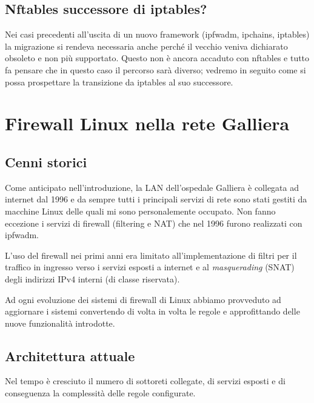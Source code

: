 \section{Nftables successore di iptables?}

Nei casi precedenti all'uscita di un nuovo framework (ipfwadm, ipchains, iptables)
la migrazione si rendeva necessaria anche perché il vecchio veniva dichiarato obsoleto
e non più supportato.
Questo non è ancora accaduto con nftables e tutto fa pensare che in questo
caso il percorso sarà diverso; vedremo in seguito come si possa
prospettare la transizione da iptables al suo successore.

\chapter{Firewall Linux nella rete Galliera}

\section{Cenni storici}

Come anticipato nell'introduzione, la LAN dell'ospedale Galliera è collegata
ad internet dal 1996 e da sempre tutti i principali servizi di rete sono stati
gestiti da macchine Linux delle quali mi sono personalemente occupato.
Non fanno eccezione i servizi di firewall (filtering e NAT) che nel 1996
furono realizzati con ipfwadm.

L'uso del firewall nei primi anni era limitato all'implementazione di filtri
per il traffico in ingresso verso i servizi esposti a internet e al {\em
masquerading} (SNAT) degli indirizzi IPv4 interni (di classe riservata).

Ad ogni evoluzione dei sistemi di firewall di Linux abbiamo provveduto ad
aggiornare i sistemi convertendo di volta in volta le regole e approfittando
delle nuove funzionalità introdotte.

\section{Architettura attuale}
Nel tempo è cresciuto il numero di sottoreti collegate, di servizi esposti e
di conseguenza la complessità delle regole configurate.


